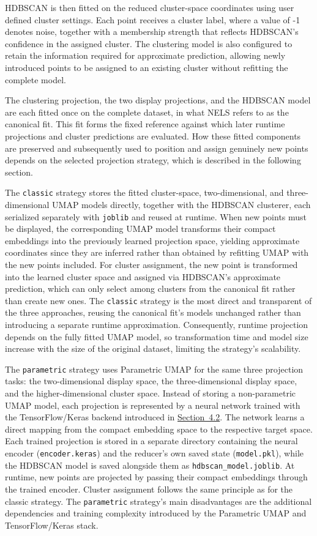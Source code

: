 HDBSCAN is then fitted on the reduced cluster-space coordinates using user defined cluster settings. Each point receives a cluster label, where a value of -1 denotes noise, together with a membership strength that reflects HDBSCAN's confidence in the assigned cluster. The clustering model is also configured to retain the information required for approximate prediction, allowing newly introduced points to be assigned to an existing cluster without refitting the complete model.

The clustering projection, the two display projections, and the HDBSCAN model are each fitted once on the complete dataset, in what NELS refers to as the canonical fit. This fit forms the fixed reference against which later runtime projections and cluster predictions are evaluated. How these fitted components are preserved and subsequently used to position and assign genuinely new points depends on the selected projection strategy, which is described in the following section.

The \texttt{classic} strategy stores the fitted cluster-space, two-dimensional, and three-dimensional UMAP models directly, together with the HDBSCAN clusterer, each serialized separately with \texttt{joblib} and reused at runtime. When new points must be displayed, the corresponding UMAP model transforms their compact embeddings into the previously learned projection space, yielding approximate coordinates since they are inferred rather than obtained by refitting UMAP with the new points included.
For cluster assignment, the new point is transformed into the learned cluster space and assigned via HDBSCAN's approximate prediction, which can only select among clusters from the canonical fit rather than create new ones. The \texttt{classic} strategy is the most direct and transparent of the three approaches, reusing the canonical fit's models unchanged rather than introducing a separate runtime approximation. Consequently, runtime projection depends on the fully fitted UMAP model, so transformation time and model size increase with the size of the original dataset, limiting the strategy's scalability.

The \texttt{parametric} strategy uses Parametric UMAP for the same three projection tasks: the two-dimensional display space, the three-dimensional display space, and the higher-dimensional cluster space. Instead of storing a non-parametric UMAP model, each projection is represented by a neural network trained with the TensorFlow/Keras backend introduced in \hyperref[sec:4.2]{Section~4.2}. The network learns a direct mapping from the compact embedding space to the respective target space.
Each trained projection is stored in a separate directory containing the neural encoder (\texttt{encoder.keras}) and the reducer's own saved state (\texttt{model.pkl}), while the HDBSCAN model is saved alongside them as \texttt{hdbscan\_model.joblib}. At runtime, new points are projected by passing their compact embeddings through the trained encoder. Cluster assignment follows the same principle as for the classic strategy.
The \texttt{parametric} strategy's main disadvantages are the additional dependencies and training complexity introduced by the Parametric UMAP and TensorFlow/Keras stack.

